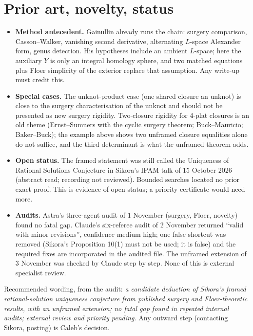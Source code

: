\documentclass[11pt]{amsart}
\theoremstyle{remark}
\begin{document}
\section{Prior art, novelty, status}

\begin{itemize}
\item \textbf{Method antecedent.} Gainullin \cite[Thm.~8.2]{Gainullin} already runs the chain: surgery comparison, Casson--Walker, vanishing second derivative, alternating $L$-space Alexander form, genus detection. His hypotheses include an ambient $L$-space; here the auxiliary $Y$ is only an integral homology sphere, and two matched equations plus Floer simplicity of the exterior replace that assumption. Any write-up must credit this.
\item \textbf{Special cases.} The unknot-product case (one shared closure an unknot) is close to the surgery characterisation of the unknot \cite{KMOS} and should not be presented as new surgery rigidity. Two-closure rigidity for 4-plat closures is an old theme (Ernst--Sumners \cite{ES} with the cyclic surgery theorem; Buck--Mauricio; Baker--Buck); the example above shows two unframed closure equalities alone do not suffice, and the third determinant is what the unframed theorem adds.
\item \textbf{Open status.} The framed statement was still called the Uniqueness of Rational Solutions Conjecture in Sikora's IPAM talk of 15 October 2026 \cite{SikoraTalk} (abstract read; recording not reviewed). Bounded searches located no prior exact proof. This is evidence of open status; a priority certificate would need more.
\item \textbf{Audits.} Astra's three-agent audit of 1 November (surgery, Floer, novelty) found no fatal gap. Claude's six-referee audit of 2 November returned ``valid with minor revisions'', confidence medium-high; one false shortcut was removed (Sikora's Proposition 10(1) must not be used; it is false) and the required fixes are incorporated in the audited file. The unframed extension of 3 November was checked by Claude step by step. None of this is external specialist review.
\end{itemize}

Recommended wording, from the audit: \emph{a candidate deduction of Sikora's framed rational-solution uniqueness conjecture from published surgery and Floer-theoretic results, with an unframed extension; no fatal gap found in repeated internal audits; external review and priority pending.} Any outward step (contacting Sikora, posting) is Caleb's decision.
\end{document}
